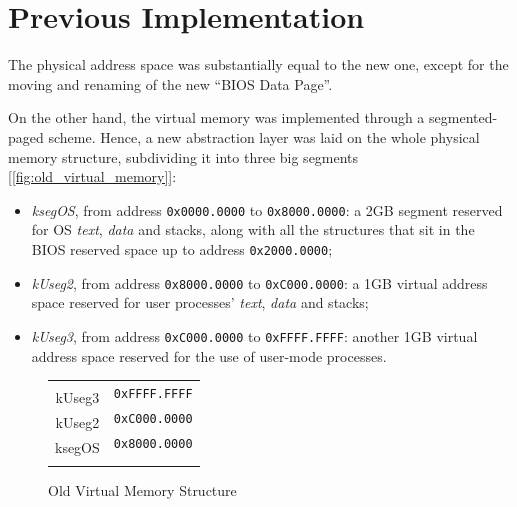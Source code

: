 \documentclass[12pt,a4paper,openright,twoside]{report}
\begin{document}
\section{Previous Implementation}
The physical address space was substantially equal to the new one, except for the moving and renaming of the new ``BIOS Data Page''.

On the other hand, the virtual memory was implemented through a segmented-paged scheme.
Hence, a new abstraction layer was laid on the whole physical memory structure, subdividing it into three big segments [\autoref{fig:old_virtual_memory}]:
\begin{itemize}
	\item \textit{ksegOS}, from address \texttt{0x0000.0000} to \texttt{0x8000.0000}: a 2GB segment reserved for OS \textit{text}, \textit{data} and stacks, along with all the structures that sit in the BIOS reserved space up to address \texttt{0x2000.0000};
	\item \textit{kUseg2}, from address \texttt{0x8000.0000} to \texttt{0xC000.0000}: a 1GB virtual address space reserved for user processes' \textit{text}, \textit{data} and stacks;
	\item \textit{kUseg3}, from address \texttt{0xC000.0000} to \texttt{0xFFFF.FFFF}: another 1GB virtual address space reserved for the use of user-mode processes.
\end{itemize}

\begin{figure}[h]
	\centering
	\begin{tabular}{cl}
		\multicolumn{1}{m{3cm}}{}                     & \multirow{2}{*}{\texttt{0xFFFF.FFFF}} \\ \cline{1-1}
		\multicolumn{1}{|c|}{\multirow{2}{*}{kUseg3}} &                                       \\
		\multicolumn{1}{|c|}{}                        & \multirow{2}{*}{\texttt{0xC000.0000}} \\ \cline{1-1}
		\multicolumn{1}{|c|}{\multirow{2}{*}{kUseg2}} &                                       \\
		\multicolumn{1}{|c|}{}                        & \multirow{2}{*}{\texttt{0x8000.0000}} \\ \cline{1-1}
		\multicolumn{1}{|c|}{\multirow{4}{*}{ksegOS}} &                                       \\
		\multicolumn{1}{|c|}{}                        & \multirow{4}{*}{}                     \\
		\multicolumn{1}{|c|}{}                        &                                       \\
		\multicolumn{1}{|c|}{}                        & \multirow{2}{*}{\texttt{0x0000.0000}} \\ \cline{1-1}
		\multicolumn{1}{l}{}                          &
	\end{tabular}
	\caption{Old Virtual Memory Structure}
	\label{fig:old_virtual_memory}
\end{figure}
\end{document}
